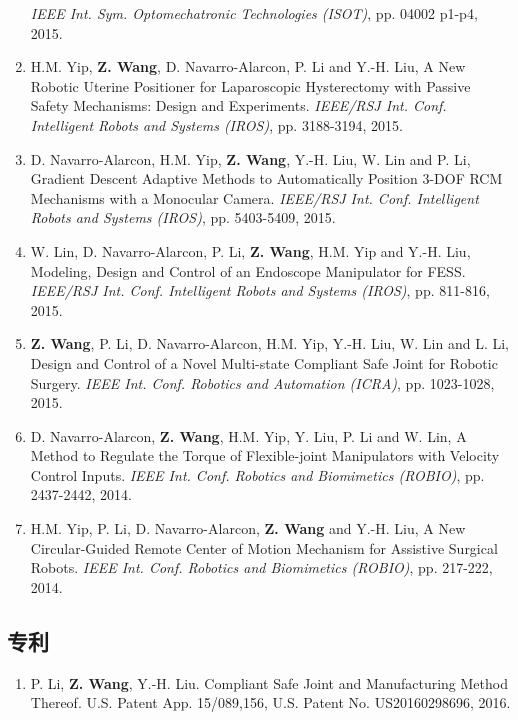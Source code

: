 \documentclass[10pt,letterpaper]{article}
\begin{document}
\begin{enumerate}
    \textit{{IEEE} Int. Sym. Optomechatronic Technologies (ISOT)}, pp. 04002 p1-p4, 2015.
    \item H.M. Yip, \textbf{Z. Wang}, D. Navarro-Alarcon, P. Li and Y.-H. Liu,
    A New Robotic Uterine Positioner for Laparoscopic Hysterectomy with Passive Safety Mechanisms: Design and Experiments.
    \textit{{IEEE/RSJ} Int. Conf. Intelligent Robots and Systems (IROS)}, pp. 3188-3194, 2015.
    \item D. Navarro-Alarcon, H.M. Yip, \textbf{Z. Wang}, Y.-H. Liu, W. Lin and P. Li,
    Gradient Descent Adaptive Methods to Automatically Position 3-DOF RCM Mechanisms with a Monocular Camera.
    \textit{{IEEE/RSJ} Int. Conf. Intelligent Robots and Systems (IROS)}, pp. 5403-5409, 2015.
    \item W. Lin, D. Navarro-Alarcon, P. Li, \textbf{Z. Wang}, H.M. Yip and Y.-H. Liu,
    Modeling, Design and Control of an Endoscope Manipulator for FESS.
    \textit{{IEEE/RSJ} Int. Conf. Intelligent Robots and Systems (IROS)}, pp. 811-816, 2015.
    \item \textbf{Z. Wang}, P. Li, D. Navarro-Alarcon, H.M. Yip, Y.-H. Liu, W. Lin and L. Li,
    Design and Control of a Novel Multi-state Compliant Safe Joint for Robotic Surgery.
    \textit{{IEEE} Int. Conf. Robotics and Automation (ICRA)}, pp. 1023-1028, 2015.
    \item D. Navarro-Alarcon, \textbf{Z. Wang}, H.M. Yip, Y. Liu, P. Li and W. Lin,
    A Method to Regulate the Torque of Flexible-joint Manipulators with Velocity Control Inputs.
    \textit{{IEEE} Int. Conf. Robotics and Biomimetics (ROBIO)}, pp. 2437-2442, 2014.
    \item H.M. Yip, P. Li, D. Navarro-Alarcon, \textbf{Z. Wang} and Y.-H. Liu,
    A New Circular-Guided Remote Center of Motion Mechanism for Assistive Surgical Robots.
    \textit{{IEEE} Int. Conf. Robotics and Biomimetics (ROBIO)}, pp. 217-222, 2014.
\end{enumerate}

\subsection*{专利}
\begin{enumerate}
    \item P. Li, \textbf{Z. Wang}, Y.-H. Liu.
    Compliant Safe Joint and Manufacturing Method Thereof.
    U.S. Patent App. 15/089,156, U.S. Patent No. US20160298696, 2016.
\end{enumerate}

\end{document}
